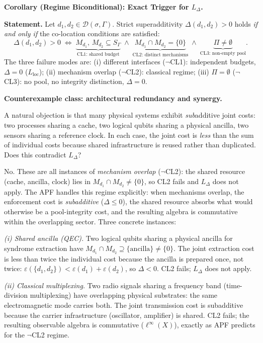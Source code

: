 \documentclass[11pt]{article}
\theoremstyle{remark}
\begin{document}
\medskip\noindent\textbf{Corollary (Regime Biconditional): Exact Trigger for $L_\Delta$.}

\textbf{Statement.}  Let $d_1, d_2 \in \mathcal{D}(\sigma,\Gamma)$.  Strict superadditivity $\Delta(d_1,d_2) > 0$ holds \emph{if and only if} the co-location conditions are satisfied:
\[
\Delta(d_1,d_2) > 0 \;\iff\; \underbrace{M_{d_1},\, M_{d_2} \subseteq S_\Gamma}_{\text{CL1: shared budget}} \;\wedge\; \underbrace{M_{d_1} \cap M_{d_2} = \{0\}}_{\text{CL2: distinct mechanisms}} \;\wedge\; \underbrace{\Pi \ne \emptyset}_{\text{CL3: non-empty pool}}.
\]
The three failure modes are: (i) different interfaces ($\neg$CL1): independent budgets, $\Delta = 0$ ($L_{\mathrm{loc}}$); (ii) mechanism overlap ($\neg$CL2): classical regime; (iii) $\Pi = \emptyset$ ($\neg$CL3): no pool, no integrity distinction, $\Delta = 0$.

\smallskip\noindent\textbf{Counterexample class: architectural redundancy and synergy.}

A natural objection is that many physical systems exhibit \emph{sub}additive joint costs: two processes sharing a cache, two logical qubits sharing a physical ancilla, two sensors sharing a reference clock.  In each case, the joint cost is \emph{less} than the sum of individual costs because shared infrastructure is reused rather than duplicated.  Does this contradict $L_\Delta$?

No.  These are all instances of \emph{mechanism overlap} ($\neg$CL2): the shared resource (cache, ancilla, clock) lies in $M_{d_1} \cap M_{d_2} \ne \{0\}$, so CL2 fails and $L_\Delta$ does not apply.  The APF handles this regime explicitly: when mechanisms overlap, the enforcement cost is \emph{subadditive} ($\Delta \le 0$), the shared resource absorbs what would otherwise be a pool-integrity cost, and the resulting algebra is commutative within the overlapping sector.  Three concrete instances:

\smallskip\noindent\textit{(i) Shared ancilla (QEC).}  Two logical qubits sharing a physical ancilla for syndrome extraction have $M_{d_1} \cap M_{d_2} \supseteq \{\text{ancilla}\} \ne \{0\}$.  The joint extraction cost is less than twice the individual cost because the ancilla is prepared once, not twice: $\varepsilon(\{d_1,d_2\}) < \varepsilon(d_1) + \varepsilon(d_2)$, so $\Delta < 0$.  CL2 fails; $L_\Delta$ does not apply.

\smallskip\noindent\textit{(ii) Classical multiplexing.}  Two radio signals sharing a frequency band (time-division multiplexing) have overlapping physical substrates: the same electromagnetic mode carries both.  The joint transmission cost is subadditive because the carrier infrastructure (oscillator, amplifier) is shared.  CL2 fails; the resulting observable algebra is commutative ($\ell^\infty(X)$), exactly as APF predicts for the $\neg$CL2 regime.
\end{document}
